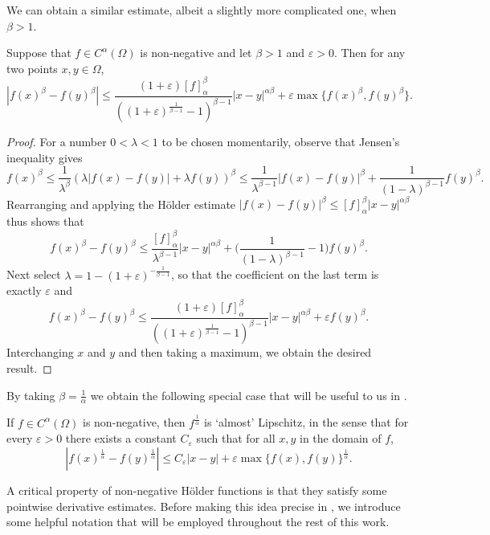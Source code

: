 \documentclass[oneside,hidelinks,indentfirst,10pt]{book}
\begin{document}
We can obtain a similar estimate, albeit a slightly more complicated one, when \(\beta>1\).


\begin{lem}\label{lem:almostLipschitz}
Suppose that \(f\in C^{\alpha}(\Omega)\) is non-negative and let \(\beta>1\) and \(\varepsilon>0\). Then for any two points \(x,y\in\Omega\),
\[
    |f(x)^\beta-f(y)^\beta|\leq \frac{(1+\varepsilon)[f]_\alpha^\beta}{((1+\varepsilon)^\frac{1}{\beta-1}-1)^{\beta-1}}|x-y|^{\alpha\beta}+\varepsilon\max\{f(x)^\beta,f(y)^\beta\}.
\]
\end{lem}


\begin{proof}
For a number \(0<\lambda<1\) to be chosen momentarily, observe that Jensen's inequality gives
\[
    f(x)^\beta\leq\frac{1}{\lambda^\beta}(\lambda|f(x)-f(y)|+\lambda f(y))^\beta\leq \frac{1}{\lambda^{\beta-1}}|f(x)-f(y)|^\beta+\frac{1}{(1-\lambda)^{\beta-1}} f(y)^\beta.
\]
Rearranging and applying the H\"older estimate \(|f(x)-f(y)|^\beta\leq [f]_\alpha^\beta|x-y|^{\alpha\beta}\) thus shows that
\[
    f(x)^\beta-f(y)^\beta\leq \frac{[f]_\alpha^\beta}{\lambda^{\beta-1}}|x-y|^{\alpha\beta}+\bigg(\frac{1}{(1-\lambda)^{\beta-1}}-1\bigg)f(y)^\beta.
\]
Next select \(\lambda=1-(1+\varepsilon)^{-\frac{1}{\beta-1}}\), so that the coefficient on the last term is exactly \(\varepsilon\) and
\[
    f(x)^\beta-f(y)^\beta\leq \frac{(1+\varepsilon)[f]_\alpha^\beta}{((1+\varepsilon)^\frac{1}{\beta-1}-1)^{\beta-1}}|x-y|^{\alpha\beta}+\varepsilon f(y)^\beta.
\]
Interchanging \(x\) and \(y\) and then taking a maximum, we obtain the desired result.
\end{proof}


By taking \(\beta=\frac{1}{\alpha}\) we obtain the following special case that will be useful to us in .


\begin{cor}
If \(f\in C^\alpha(\Omega)\) is non-negative, then \(f^\frac{1}{\alpha}\) is `almost' Lipschitz, in the sense that for every \(\varepsilon>0\) there exists a constant \(C_\varepsilon\) such that for all \(x,y\) in the domain of \(f\), 
\[
    |f(x)^\frac{1}{\alpha}-f(y)^\frac{1}{\alpha}|\leq C_\varepsilon|x-y|+\varepsilon\max\{f(x),f(y)\}^\frac{1}{\alpha}.
\]
\end{cor}


A critical property of non-negative H\"older functions is that they satisfy some pointwise derivative estimates. Before making this idea precise in , we introduce some helpful notation that will be employed throughout the rest of this work. 
\end{document}
